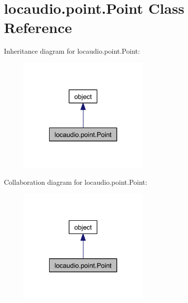 \hypertarget{classlocaudio_1_1point_1_1Point}{\section{locaudio.\-point.\-Point Class Reference}
\label{classlocaudio_1_1point_1_1Point}
}


Inheritance diagram for locaudio.\-point.\-Point\-:\nopagebreak
\begin{figure}[H]
\begin{center}
\leavevmode
\includegraphics[width=182pt]{classlocaudio_1_1point_1_1Point__inherit__graph}
\end{center}
\end{figure}


Collaboration diagram for locaudio.\-point.\-Point\-:\nopagebreak
\begin{figure}[H]
\begin{center}
\leavevmode
\includegraphics[width=182pt]{classlocaudio_1_1point_1_1Point__coll__graph}
\end{center}
\end{figure}
